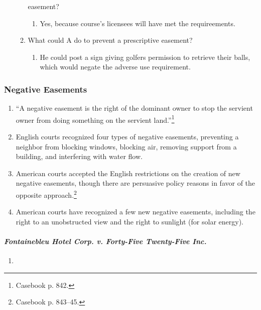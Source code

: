 \begin{enumerate}
\begin{enumerate}
        easement?
        \begin{enumerate}
            \item Yes, because course's licensees will have met the 
            requireements.
        \end{enumerate}
        \item What could A do to prevent a prescriptive easement?
        \begin{enumerate}
            \item He could post a sign giving golfers permission to retrieve 
            their balls, which would negate the adverse use requirement. 
      \end{enumerate}
    \end{enumerate}
\end{enumerate}

\subsubsection{Negative Easements}

\begin{enumerate}
    \item ``A negative easement is the right of the dominant owner to stop the 
    servient owner from doing something on the servient 
    land.''\footnote{Casebook p. 842.}
    \item English courts recognized four types of negative easements, 
    preventing a neighbor from blocking windows, blocking air, removing 
    support from a building, and interfering with water flow.
    \item American courts accepted the English restrictions on the creation of 
    new negative easements, though there are persuasive policy reasons in 
    favor of the opposite approach.\footnote{Casebook p. 843--45.}
    \item American courts have recognized a few new negative easements, 
    including the right to an unobstructed view and the right to sunlight (for 
    solar energy).
\end{enumerate}

\paragraph{\emph{Fontainebleu Hotel Corp. v. Forty-Five Twenty-Five Inc.}}

\begin{enumerate}
    \item %
\end{enumerate}

